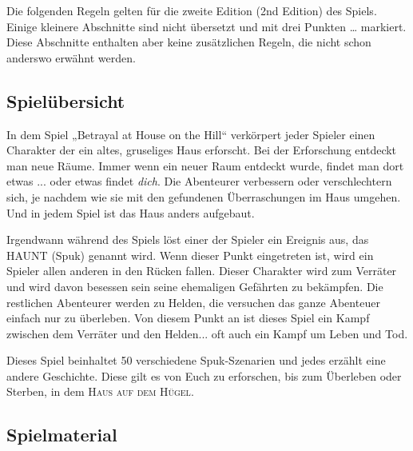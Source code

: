 
Die folgenden Regeln gelten für die zweite Edition (2nd Edition) des Spiels. Einige kleinere Abschnitte sind nicht übersetzt und mit drei Punkten … markiert. Diese Abschnitte enthalten aber keine zusätzlichen Regeln, die nicht schon anderswo erwähnt werden.

\subsection{Spielübersicht}

In dem Spiel „Betrayal at House on the Hill“ verkörpert jeder Spieler einen Charakter der ein altes, gruseliges Haus erforscht. Bei der Erforschung entdeckt man neue Räume. Immer wenn ein neuer Raum entdeckt wurde, findet man dort etwas ... oder etwas findet \emph{dich}. Die Abenteurer verbessern oder verschlechtern sich, je nachdem wie sie mit den gefundenen Überraschungen im Haus umgehen. Und in jedem Spiel ist das Haus anders aufgebaut.

Irgendwann während des Spiels löst einer der Spieler ein Ereignis aus, das HAUNT (Spuk) genannt wird. Wenn dieser Punkt eingetreten ist, wird ein Spieler allen anderen in den Rücken fallen. Dieser Charakter wird zum Verräter und wird davon besessen sein seine ehemaligen Gefährten zu bekämpfen. Die restlichen Abenteurer werden zu Helden, die versuchen das ganze Abenteuer einfach nur zu überleben. Von diesem Punkt an ist dieses Spiel ein Kampf zwischen dem Verräter und den Helden... oft auch ein Kampf um Leben und Tod.

Dieses Spiel beinhaltet 50 verschiedene Spuk-Szenarien und jedes erzählt eine andere Geschichte. Diese gilt es von Euch zu erforschen, bis zum Überleben oder Sterben, in dem \textsc{Haus auf dem Hügel}.

\subsection{Spielmaterial}

